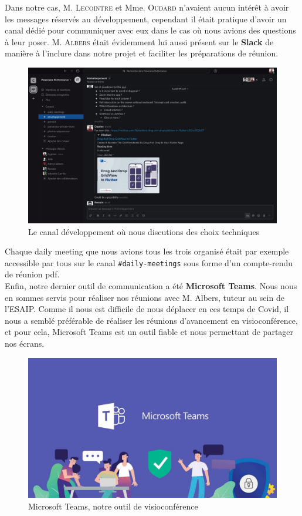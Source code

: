 Dans notre cas, M. \textsc{Lecointre} et Mme. \textsc{Oudard} n'avaient aucun intérêt à avoir les messages réservés au développement, cependant il était pratique d'avoir un canal dédié pour communiquer avec eux dans le cas où nous avions des questions à leur poser. M. \textsc{Albers} était évidemment lui aussi présent sur le \textbf{Slack} de manière à l'inclure dans notre projet et faciliter les préparations de réunion.\\

\begin{figure}[!h]
    \centering
    \includegraphics[scale=0.3]{img/screen_slack.jpeg}
    \caption{Le canal développement où nous discutions des choix techniques}
    \label{fig:my_label}
\end{figure}


Chaque daily meeting que nous avions tous les trois organisé était par exemple accessible par tous sur le canal \texttt{\#daily-meetings} sous forme d'un compte-rendu de réunion pdf.\\

Enfin, notre dernier outil de communication a été \textbf{Microsoft Teams}. Nous nous en sommes servis pour réaliser nos réunions avec M. Albers, tuteur au sein de l'ESAIP. Comme il nous est difficile de nous déplacer en ces temps de Covid, il nous a semblé préférable de réaliser les réunions d'avancement en visioconférence, et pour cela, Microsoft Teams est un outil fiable et nous permettant de partager nos écrans.

\begin{figure}[!h]
    \centering
    \includegraphics[scale=0.2]{img/teams.jpg}
    \caption{Microsoft Teams, notre outil de visioconférence}
    \label{fig:my_label}
\end{figure}

